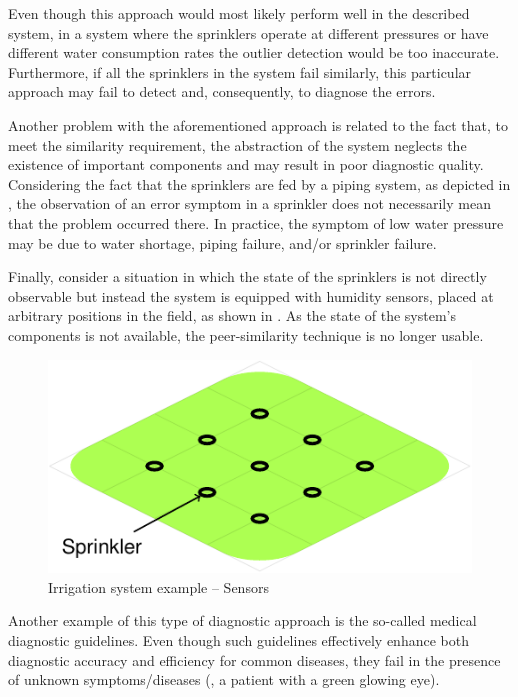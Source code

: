 Even though this approach would most likely perform well in the
described system, in a system where the sprinklers operate at
different pressures or have different water consumption rates the
outlier detection would be too inaccurate.
%
Furthermore, if all the sprinklers in the system fail similarly, this
particular approach may fail to detect and, consequently, to diagnose
the errors.

Another problem with the aforementioned approach is related to the
fact that, to meet the similarity requirement, the abstraction of the
system neglects the existence of important components and may result
in poor diagnostic quality.
%
Considering the fact that the sprinklers are fed by a piping system,
as depicted in , the
observation of an error symptom in a sprinkler does not necessarily
mean that the problem occurred there.
%
In practice, the symptom of low water pressure may be due to water
shortage, piping failure, and/or sprinkler failure.

Finally, consider a situation in which the state of the sprinklers is
not directly observable but instead the system is equipped with
humidity sensors, placed at arbitrary positions in the field, as shown
in .
%
As the state of the system's components is not available, the
peer-similarity technique is no longer usable.


\begin{figure}[ht]
  \includegraphics[page=3]{figures/introduction/figures/main.pdf}
  \caption{Irrigation system example -- Sensors\label{fig:intro:example2}}
\end{figure}

Another example of this type of diagnostic approach is the so-called
medical diagnostic guidelines.
%
Even though such guidelines effectively enhance both diagnostic
accuracy and efficiency for common diseases, they fail in the presence
of unknown symptoms/diseases (\eg, a patient with a green glowing
eye).

